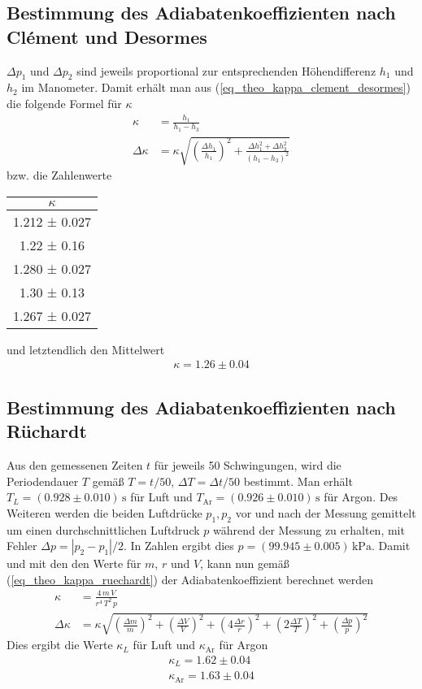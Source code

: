 \documentclass[12pt,a4paper,german]{scrartcl}
\numberwithin{equation}{section}
\begin{document}
  \subsection{Bestimmung des Adiabatenkoeffizienten nach Clément und Desormes}
  $\Delta p_1$ und $\Delta p_2$ sind jeweils proportional zur entsprechenden Höhendifferenz $h_1$ und $h_2$ im Manometer.
  Damit erhält man aus (\ref{eq_theo_kappa_clement_desormes}) die folgende Formel für $\kappa$
  \begin{align}
    \kappa &= \frac{h_1}{h_1 - h_3} \nonumber \\
    \Delta\kappa &= \kappa \sqrt{\left(\frac{\Delta h_1}{h_1}\right)^2 + \frac{\Delta h_1^2 + \Delta h_3^2}{(h_1 - h_3)^2}}
  \end{align}
  bzw. die Zahlenwerte

  \begin{center}
    \begin{tabular}{c}
      $\kappa$ \\
      \hline
      1.212 ± 0.027 \\
      1.22 ± 0.16 \\
      1.280 ± 0.027 \\
      1.30 ± 0.13 \\
      1.267 ± 0.027
    \end{tabular}
  \end{center}

  und letztendlich den Mittelwert
  \begin{align}
    \kappa = 1.26 \pm 0.04
  \end{align}

  \subsection{Bestimmung des Adiabatenkoeffizienten nach Rüchardt}
  Aus den gemessenen Zeiten $t$ für jeweils 50 Schwingungen, wird die Periodendauer $T$ gemäß $T = t / 50$, $\Delta T = \Delta t / 50$ bestimmt.
  Man erhält $T_L = (0.928 \pm 0.010) \, \text{s}$ für Luft und $T_\text{Ar} = (0.926 \pm 0.010) \, \text{s}$ für Argon.
  Des Weiteren werden die beiden Luftdrücke $p_1, p_2$ vor und nach der Messung gemittelt um einen durchschnittlichen Luftdruck $p$ während der Messung zu erhalten, mit Fehler $\Delta p = |p_2 - p_1| / 2$.
  In Zahlen ergibt dies $p = (99.945 \pm 0.005) \, \text{kPa}$.
  Damit und mit den den Werte für $m$, $r$ und $V$, kann nun gemäß (\ref{eq_theo_kappa_ruechardt}) der Adiabatenkoeffizient berechnet werden
  \begin{align}
    \kappa &= \frac{4 \, m \, V}{r^4 \, T^2 \, p} \nonumber \\
    \Delta\kappa &= \kappa \sqrt{
      \left(\frac{\Delta m}{m}\right)^2
    + \left(\frac{\Delta V}{V}\right)^2
    + \left(4 \frac{\Delta r}{r}\right)^2
    + \left(2 \frac{\Delta T}{T}\right)^2
    + \left(\frac{\Delta p}{p}\right)^2}
  \end{align}
  Dies ergibt die Werte $\kappa_L$ für Luft und $\kappa_\text{Ar}$ für Argon
  \begin{align}
    \kappa_L = 1.62 \pm 0.04 \nonumber \\
    \kappa_\text{Ar} = 1.63 \pm 0.04
  \end{align}
\end{document}
